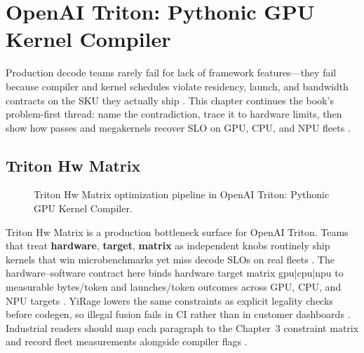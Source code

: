 \chapter{OpenAI Triton: Pythonic GPU Kernel Compiler}
\label{chap:ch17}

Production decode teams rarely fail for lack of framework features---they fail because compiler and kernel schedules violate residency, launch, and bandwidth contracts on the SKU they actually ship \citep{patel2025llminference,nvidia2022hopper}. This chapter continues the book's problem-first thread: name the contradiction, trace it to hardware limits, then show how passes and megakernels recover SLO on GPU, CPU, and NPU fleets \citep{taxbreak2026,semianalysis2024tma}.

\section{Triton Hw Matrix}
\label{sec:triton_hw_matrix}
\begin{figure}[t]
\centering
{}
\caption{Triton Hw Matrix optimization pipeline in OpenAI Triton: Pythonic GPU Kernel Compiler.}
\label{fig:triton_hw_matrix_pipeline}
\end{figure}


Triton Hw Matrix is a production bottleneck surface for OpenAI Triton. Teams that treat \textbf{hardware}, \textbf{target}, \textbf{matrix} as independent knobs routinely ship kernels that win microbenchmarks yet miss decode SLOs on real fleets \citep{patel2025llminference,nvidia2022hopper}. The hardware--software contract here binds hardware target matrix gpu|cpu|npu to measurable bytes/token and launches/token outcomes across GPU, CPU, and NPU targets \citep{taxbreak2026,semianalysis2024tma}. YiRage lowers the same constraints as explicit legality checks before codegen, so illegal fusion fails in CI rather than in customer dashboards \citep{memoryfloor2026,amd2024xdna}. Industrial readers should map each paragraph to the Chapter~3 constraint matrix and record fleet measurements alongside compiler flags \citep{nvidia2022hopper,amd2024aie}.

